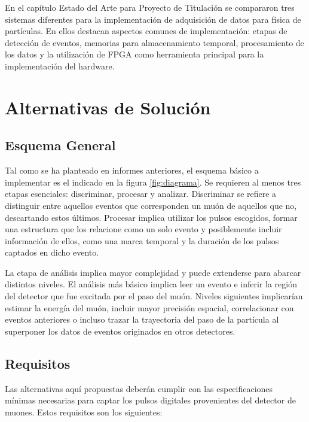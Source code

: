 En el capítulo Estado del Arte para Proyecto de Titulación \cite{Gonzalez2020EstadoTitulacion} se compararon tres sistemas diferentes para la implementación de adquisición de datos para física de partículas. En ellos destacan aspectos comunes de implementación: etapas de detección de eventos, memorias para almacenamiento temporal, procesamiento de los datos y la utilización de FPGA como herramienta principal para la implementación del hardware.



\section{Alternativas de Solución}
\subsection*{Esquema General}
Tal como se ha planteado en informes anteriores, el esquema básico a implementar es el indicado en la figura \ref{fig:diagrama}. Se requieren al menos tres etapas esenciales: discriminar, procesar y analizar. Discriminar se refiere a distinguir entre aquellos eventos que corresponden un muón de aquellos que no, descartando estos últimos. Procesar implica utilizar los pulsos escogidos, formar una estructura que los relacione como un solo evento y posiblemente incluir información de ellos, como una marca temporal y la duración de los pulsos captados en dicho evento. 

La etapa de análisis implica mayor complejidad y puede extenderse para abarcar distintos niveles. El análisis más básico implica leer un evento e inferir la región del detector que fue excitada por el paso del muón. Niveles siguientes implicarían estimar la energía del muón, incluir mayor precisión espacial, correlacionar con eventos anteriores o incluso trazar la trayectoria  del paso de la partícula al superponer los datos de eventos originados en otros detectores.

\newpage
\subsection*{Requisitos}
Las alternativas aquí propuestas deberán cumplir con las especificaciones mínimas necesarias para captar los pulsos digitales provenientes del detector de muones. Estos requisitos son los siguientes:

